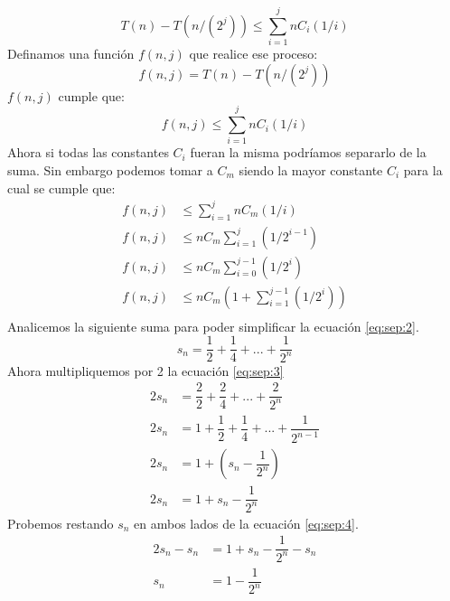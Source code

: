 \documentclass[12pt]{article}
\begin{document}
\begin{equation}\label{eq:frth:2}
T(n)-T(n/(2^j)) \leq \sum_{i=1}^{j}{nC_i(1/i)}
\end{equation}
Definamos una función $f(n,j)$ que realice ese proceso:
\begin{equation}\label{eq:ffth:2}
f(n,j) = T(n)-T(n/(2^j))
\end{equation}
$f(n,j)$ cumple que:
\begin{equation}\label{eq:sxth:2}
f(n,j) \leq \sum_{i=1}^{j}{nC_i(1/i)}
\end{equation}
Ahora si todas las constantes $C_i$ fueran la misma podríamos separarlo de la suma. Sin embargo podemos tomar a $C_m$ siendo la mayor constante $C_i$ para la cual se cumple que:
\begin{equation}\label{eq:sep:2}
\begin{split}
f(n,j) & \leq \sum_{i=1}^{j}{nC_m(1/i)} \\
f(n,j) & \leq nC_m \sum_{i=1}^{j}{(1/2^{i-1})} \\
f(n,j) & \leq nC_m \sum_{i=0}^{j-1}{(1/2^{i})} \\
f(n,j) & \leq nC_m (1 + \sum_{i=1}^{j-1}{(1/2^{i})}) \\
\end{split}
\end{equation}
Analicemos la siguiente suma para poder simplificar la ecuación \ref{eq:sep:2}.\\
\begin{equation}\label{eq:sep:3}
s_n = \dfrac{1}{2} + \dfrac{1}{4} + ... + \dfrac{1}{2^n}  
\end{equation}
Ahora multipliquemos por 2 la ecuación \eqref{eq:sep:3}
\begin{equation}\label{eq:sep:4}
\begin{split}
2s_n & = \dfrac{2}{2} + \dfrac{2}{4} + ... + \dfrac{2}{2^n}\\
2s_n & = 1 + \dfrac{1}{2} + \dfrac{1}{4} + ... + \dfrac{1}{2^{n-1}}\\
2s_n & = 1 + (s_n - \dfrac{1}{2^{n}})\\
2s_n & = 1 + s_n - \dfrac{1}{2^{n}}
\end{split}  
\end{equation}
Probemos restando $s_n$ en ambos lados de la ecuación \ref{eq:sep:4}.
\begin{equation}\label{eq:sep:5}
\begin{split}
2s_n  - s_n& = 1 + s_n - \dfrac{1}{2^{n}} - s_n\\
s_n & = 1 - \dfrac{1}{2^{n}}\\
\end{split}  
\end{equation}
\end{document}
